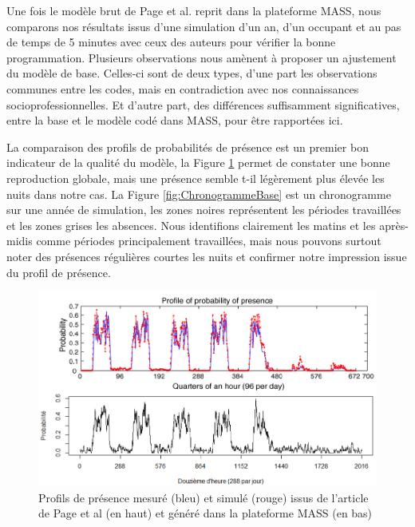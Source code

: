 Une fois le modèle brut de Page et al. \cite{Page-08} reprit dans la plateforme MASS, nous comparons nos résultats issus d'une simulation d'un an, d'un occupant et au pas de temps de 5 minutes avec ceux des auteurs pour vérifier la bonne programmation. Plusieurs observations nous amènent à proposer un ajustement du modèle de base. Celles-ci sont de deux types, d'une part les observations communes entre les codes, mais en contradiction avec nos connaissances socioprofessionnelles. Et d'autre part, des différences suffisamment significatives, entre la base et le modèle codé dans MASS, pour être rapportées ici.

La comparaison des profils de probabilités de présence est un premier bon indicateur de la qualité du modèle, la Figure \ref{fig:ProfilPresence} permet de constater une bonne reproduction globale, mais une présence semble t-il légèrement plus élevée les nuits dans notre cas. La Figure \ref{fig:ChronogrammeBase} est un chronogramme sur une année de simulation, les zones noires représentent les périodes travaillées et les zones grises les absences. Nous identifions clairement les matins et les après-midis comme périodes principalement travaillées, mais nous pouvons surtout noter des présences régulières courtes les nuits et confirmer notre impression issue du profil de présence.

\begin{figure}[H]
\centering
\includegraphics[scale=0.6]{Images/PageActivities/ProfilPresence}
\caption{Profils de présence mesuré (bleu) et simulé (rouge) issus de l'article de Page et al \cite{Page-08} (en haut) et généré dans la plateforme MASS (en bas)}
\label{fig:ProfilPresence}
\end{figure}

